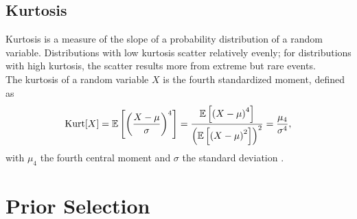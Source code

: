 \subsection{Kurtosis}
Kurtosis is a measure of the slope of a probability distribution of a random variable. Distributions with low kurtosis scatter relatively evenly; for distributions with high kurtosis, the scatter results more from extreme but rare events. \\
The kurtosis of a random variable $X$ is the fourth standardized moment, defined as
\begin{equation}
    \hbox{Kurt}[X]=\mathbb{E}\left[\left(\frac{X-\mu}{\sigma}\right)^4\right] = \frac{\mathbb{E}\left[\left(X-\mu\right)^4\right]}{\left(\mathbb{E}\left[\left(X-\mu\right)^2\right]\right)^2}=\frac{\mu_4}{\sigma^4},
\end{equation}
with $\mu_4$ the fourth central moment and $\sigma$ the standard deviation \autocite[][]{decarlo1997meaning, wilkins1944note}.
\clearpage
\section{Prior Selection}
